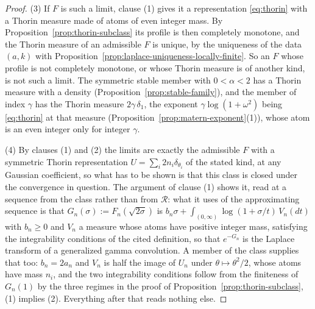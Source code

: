 \begin{proof}
(3) If $F$ is such a limit, clause (1) gives it a representation \ref{eq:thorin} with a Thorin
measure made of atoms of even integer mass. By Proposition~\ref{prop:thorin-subclass} its
profile is then completely monotone, and the Thorin measure of an admissible $F$ is unique, by
the uniqueness of the data $(a,k)$ with
Proposition~\ref{prop:laplace-uniqueness-locally-finite}. So an $F$ whose profile is not
completely monotone, or whose Thorin measure is of another kind, is not such a limit. The
symmetric stable member with $0 < \alpha < 2$ has a Thorin measure with a density
(Proposition~\ref{prop:stable-family}), and the \Matern{} member of index $\gamma$ has the
Thorin measure $2\gamma\,\delta_1$, the exponent $\gamma\log(1+\omega^2)$ being \ref{eq:thorin}
at that measure (Proposition~\ref{prop:matern-exponent}(1)), whose atom is an even integer only
for integer $\gamma$.

(4) By clauses (1) and (2) the limits are exactly the admissible $F$ with a symmetric Thorin
representation $U = \sum_i 2n_i\delta_{\theta_i}$ of the stated kind, at any Gaussian coefficient,
so what has to be shown is that this class is closed under the convergence in question. The
argument of clause (1) shows it, read at a sequence from the class rather than from
$\mathcal{R}$: what it uses of the approximating sequence is that $G_n(\sigma) :=
F_n(\sqrt{2\sigma})$ is $b_n\sigma + \int_{(0,\infty)}\log(1+\sigma/t)\,V_n(dt)$ with $b_n \ge 0$
and $V_n$ a measure whose atoms have positive integer mass, satisfying the integrability
conditions of the cited definition, so that $e^{-G_n}$ is the Laplace transform of a generalized
gamma convolution. A member of the class supplies that too: $b_n = 2a_n$ and $V_n$ is half the
image of $U_n$ under $\theta \mapsto \theta^2/2$, whose atoms have mass $n_i$, and the two
integrability conditions follow from the finiteness of $G_n(1)$ by the three regimes in the proof
of Proposition~\ref{prop:thorin-subclass}, (1) implies (2). Everything after that reads nothing
else.


\end{proof}
